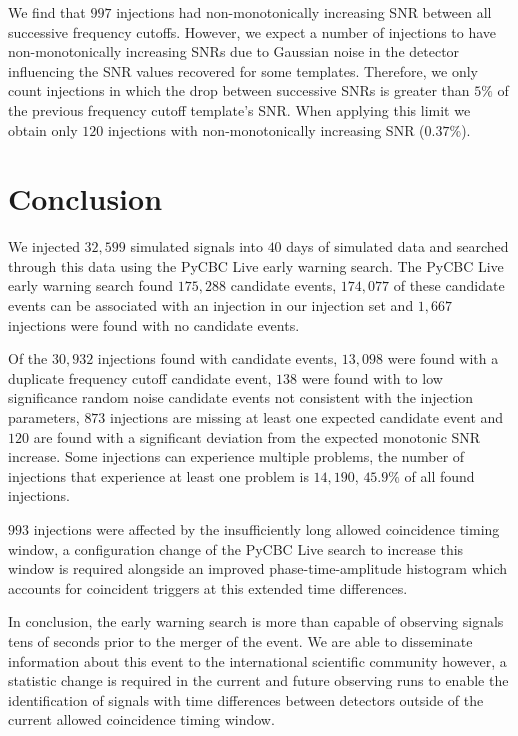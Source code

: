 We find that $997$ injections had non-monotonically increasing SNR between all successive frequency cutoffs. However, we expect a number of injections to have non-monotonically increasing SNRs due to Gaussian noise in the detector influencing the SNR values recovered for some templates. Therefore, we only count injections in which the drop between successive SNRs is greater than $5\%$ of the previous frequency cutoff template's SNR. When applying this limit we obtain only $120$ injections with non-monotonically increasing SNR ($0.37\%$).




\section{\label{6:sec:conclusion}Conclusion}

We injected $32,599$ simulated \gwadj signals into $40$ days of simulated \gwadj data and searched through this data using the PyCBC Live early warning search. The PyCBC Live early warning search found $175,288$ candidate events, $174,077$ of these candidate events can be associated with an injection in our injection set and $1,667$ injections were found with no candidate events.

Of the $30,932$ injections found with candidate events, $13,098$ were found with a duplicate frequency cutoff candidate event, $138$ were found with to low significance random noise candidate events not consistent with the injection parameters, $873$ injections are missing at least one expected candidate event and $120$ are found with a significant deviation from the expected monotonic SNR increase. Some injections can experience multiple problems, the number of injections that experience at least one problem is $14,190$, $45.9\%$ of all found injections.

$993$ injections were affected by the insufficiently long allowed coincidence timing window, a configuration change of the PyCBC Live search to increase this window is required alongside an improved phase-time-amplitude histogram which accounts for coincident \gwadj triggers at this extended time differences. 

In conclusion, the early warning search is more than capable of observing \gwadj signals tens of seconds prior to the merger of the \gwadj event. We are able to disseminate information about this event to the international scientific community however, a statistic change is required in the current and future observing runs to enable the identification of \gwadj signals with time differences between detectors outside of the current allowed coincidence timing window.




